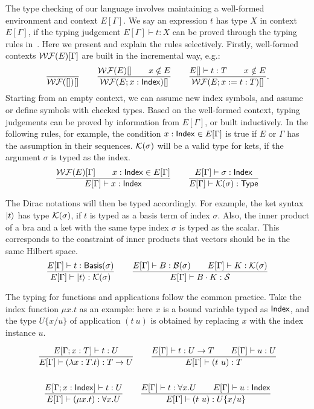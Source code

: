 \documentclass[runningheads]{llncs}
\begin{document}
The type checking of our language involves maintaining a well-formed environment and context $E[\Gamma]$.
We say an expression $t$ has type $X$ in context $E[\Gamma]$, if the typing judgement $E[\Gamma] \vdash t : X$ can be proved through the typing rules in~. Here we present and explain the rules selectively. Firstly, well-formed contexts $\mathcal{WF}(E)[\Gamma]$ are built in the incremental way, e.g.:
\[
    \frac{}{\mathcal{WF}([])[]}
    \qquad
    \frac{\mathcal{WF}(E)[] \qquad x \notin E}{\mathcal{WF}(E; x : \mathsf{Index})[]}
    \qquad
    \frac{E[]\vdash t:T \qquad x \notin E}{\mathcal{WF}(E; x:=t:T)[]}.
\]
Starting from an empty context, we can assume new index symbols, and assume or define symbols with checked types. Based on the well-formed context, typing judgements can be proved by information from $E[\Gamma]$, or built inductively. In the following rules, for example, the condition $x : \mathsf{Index} \in E[\Gamma]$ is true if $E$ or $\Gamma$ has the assumption in their sequences. $\mathcal{K}(\sigma)$ will be a valid type for kets, if the argument $\sigma$ is typed as the index.
\begin{gather*}
    \frac{\mathcal{WF}(E)[\Gamma] \qquad x : \mathsf{Index} \in E[\Gamma]}{E[\Gamma] \vdash x : \mathsf{Index}}
    \qquad
    \frac{E[\Gamma] \vdash \sigma : \mathsf{Index}}{E[\Gamma] \vdash \mathcal{K}(\sigma) : \mathsf{Type}}
\end{gather*}

The Dirac notations will then be typed accordingly. For example, the ket syntax $\ket{t}$ has type $\mathcal{K}(\sigma)$, if $t$ is typed as a basis term of index $\sigma$. Also, the inner product of a bra and a ket with the same type index $\sigma$ is typed as the scalar. This corresponds to the constraint of inner products that vectors should be in the same Hilbert space.
\begin{gather*}
    \frac{E[\Gamma]\vdash t : \mathsf{Basis}(\sigma)}{E[\Gamma] \vdash \ket{t} : \mathcal{K}(\sigma)}
    \qquad
    \frac{E[\Gamma]\vdash B : \mathcal{B}(\sigma) \qquad E[\Gamma]\vdash K : \mathcal{K}(\sigma)}{E[\Gamma] \vdash B \cdot K : \mathcal{S}}
\end{gather*}

The typing for functions and applications follow the common practice. 
Take the index function $\mu x. t$ as an example: here $x$ is a bound variable typed as $\mathsf{Index}$, and the type $U\{x/u\}$ of application $(t\ u)$ is obtained by replacing $x$ with the index instance $u$.


\begin{gather*}
    \frac{E[\Gamma; x : T] \vdash t : U}{E[\Gamma] \vdash (\lambda x : T . t) : T \to U}
    \qquad
    \frac{E[\Gamma] \vdash t:U \to T \qquad E[\Gamma] \vdash u:U}{E[\Gamma] \vdash (t\ u):T} \\
    \\
    \frac{E[\Gamma; x : \mathsf{Index}] \vdash t : U}{E[\Gamma] \vdash (\mu x.t) : \forall x.U}
    \qquad
    \frac{E[\Gamma] \vdash t:\forall x.U \qquad E[\Gamma] \vdash u : \mathsf{Index}}{E[\Gamma] \vdash (t\ u):U\{x/u\}}
\end{gather*}
\end{document}
